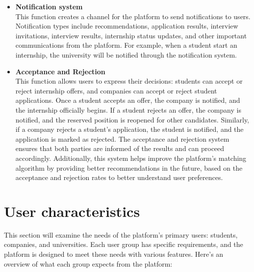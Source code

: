 \begin{itemize}[label={ }]
    \item \textcolor{bluepoli}{\textbf{Notification system}}
    \\This function creates a channel for the platform to send notifications to users. Notification types include recommendations, application results,
    interview invitations, interview results, internship status updates, and other important communications from the platform. For example, when a student
    start an internship, the university will be notified through the notification system.

    \item \textcolor{bluepoli}{\textbf{Acceptance and Rejection}}
    \\This function allows users to express their decisions: students can accept or reject internship offers, and companies can accept or reject student applications.
    Once a student accepts an offer, the company is notified, and the internship officially begins. If a student rejects an offer, the company is notified, and the 
    reserved position is reopened for other candidates. Similarly, if a company rejects a student’s application, the student is notified, and the application is 
    marked as rejected.
    The acceptance and rejection system ensures that both parties are informed of the results and can proceed accordingly. Additionally, this system helps 
    improve the platform's matching algorithm by providing better recommendations in the future, based on the acceptance and rejection rates to better understand 
    user preferences.
\end{itemize}

\section{User characteristics}\label{subsec:user_characteristics}
This section will examine the needs of the platform's primary users: students, companies, and universities. 
Each user group has specific requirements, and the platform is designed to meet these needs with various features. 
Here’s an overview of what each group expects from the platform:

